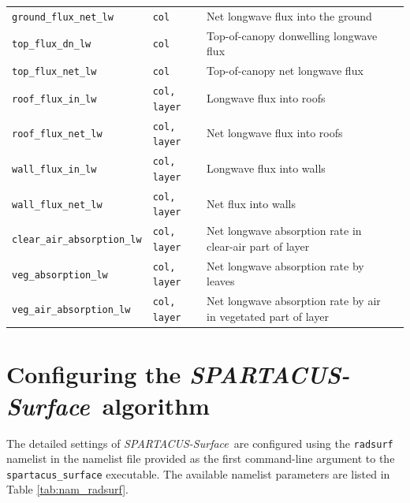 \documentclass[a4,oneside]{article}
\def\codesize{\small}
\def\codetabsize{\footnotesize}
\def\spsurf{\emph{SPARTACUS-Surface}}
\def\code#1{{\codesize\texttt{#1}}}
\def\codetab#1{{\codetabsize\texttt{#1}}}
\begin{document}
\begin{center}
\begin{longtable}{llLp{7cm}}
\codetab{ground\_flux\_net\_lw} & \codetab{col} & Net longwave flux into the ground\\
\codetab{top\_flux\_dn\_lw} & \codetab{col} & Top-of-canopy donwelling longwave flux\\
\codetab{top\_flux\_net\_lw} & \codetab{col} & Top-of-canopy net longwave flux\\
\codetab{roof\_flux\_in\_lw} & \codetab{col, layer} & Longwave flux into roofs\\
\codetab{roof\_flux\_net\_lw} & \codetab{col, layer} & Net longwave flux into roofs\\
\codetab{wall\_flux\_in\_lw} & \codetab{col, layer} & Longwave flux into walls\\
\codetab{wall\_flux\_net\_lw} & \codetab{col, layer} & Net flux into walls\\
\codetab{clear\_air\_absorption\_lw} & \codetab{col, layer} & Net longwave absorption rate in clear-air part of layer\\
\codetab{veg\_absorption\_lw} & \codetab{col, layer} & Net longwave absorption rate by leaves\\
\codetab{veg\_air\_absorption\_lw} & \codetab{col, layer} & Net longwave absorption rate by air in vegetated part of layer\\
\hline
\end{longtable}
\end{center}


\section{Configuring the \spsurf\ algorithm}
\label{sec:nam_radsurf}
The detailed settings of \spsurf\ are configured using the
\code{radsurf} namelist in the namelist file provided as the first
command-line argument to the \code{spartacus\_surface} executable. The
available namelist parameters are listed in Table
\ref{tab:nam_radsurf}.

\end{document}

